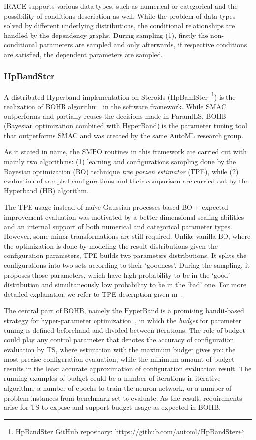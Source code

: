 IRACE supports various data types, such as numerical or categorical and the possibility of conditions description as well. While the problem of data types solved by different underlying distributions, the conditional relationships are handled by the dependency graphs. During sampling (1), firstly the non-conditional parameters are sampled and only afterwards, if respective conditions are satisfied, the dependent parameters are sampled.


\subsubsection{HpBandSter}\label{bg: bohb}
A distributed Hyperband implementation on Steroids (HpBandSter~\footnote{HpBandSter GitHub repository: \url{https://github.com/automl/HpBandSter}}) is the realization of BOHB algorithm~\cite{falkner2018bohb} in the software framework.
While SMAC outperforms and partially reuses the decisions made in ParamILS, BOHB (Bayesian optimization combined with HyperBand) is the parameter tuning tool that outperforms SMAC and was created by the same AutoML research group.

As it stated in name, the SMBO routines in this framework are carried out with mainly two algorithms: (1) learning and configurations sampling done by the Bayesian optimization (BO) technique \emph{tree parzen estimator} (TPE), while (2) evaluation of sampled configurations and their comparison are carried out by the Hyperband (HB) algorithm.

The TPE usage instead of na\"ive Gaussian processes-based BO + expected improvement evaluation was motivated by a better dimensional scaling abilities and an internal support of both numerical and categorical parameter types. However, some minor transformations are still required.
Unlike vanilla BO, where the optimization is done by modeling the result distributions given the configuration parameters, TPE builds two parameters distributions. It splits the configurations into two sets according to their `goodness'. During the sampling, it proposes those parameters, which have high probability to be in the `good' distribution and simultaneously low probability to be in the `bad' one. For more detailed explanation we refer to TPE description given in~\cite{bergstra2011algorithms}.

The central part of BOHB, namely the HyperBand is a promising bandit-based strategy for hyper-parameter optimization~\cite{li2017hyperband}, in which the \emph{budget} for parameter tuning is defined beforehand and divided between iterations. The role of budget could play any control parameter that denotes the accuracy of configuration evaluation by TS, where estimation with the maximum budget gives you the most precise configuration evaluation, while the minimum amount of budget results in the least accurate approximation of configuration evaluation result.
The running examples of budget could be a number of iterations in iterative algorithm, a number of epochs to train the neuron network, or a number of problem instances from benchmark set to evaluate. As the result, requirements arise for TS to expose and support budget usage as expected in BOHB.

